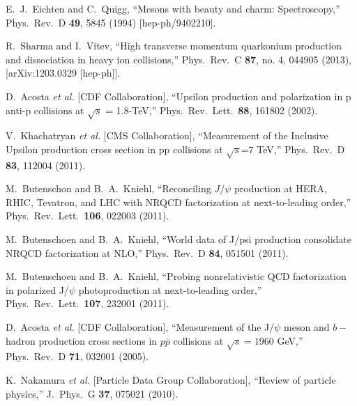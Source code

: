 \documentclass[aps,prc,preprint,superscriptaddress,showpacs,showkeys,amsmath]{revtex4-1}
\begin{document}
\begin{thebibliography}{100}
  E.~J.~Eichten and C.~Quigg,
  ``Mesons with beauty and charm: Spectroscopy,''
  Phys.\ Rev.\ D {\bf 49}, 5845 (1994)
  [hep-ph/9402210].

  R.~Sharma and I.~Vitev,
  ``High transverse momentum quarkonium production and dissociation in heavy ion collisions,''
  Phys.\ Rev.\ C {\bf 87}, no. 4, 044905 (2013),
  [arXiv:1203.0329 [hep-ph]].

  D.~Acosta {\it et al.}  [CDF Collaboration],
  ``Upsilon production and polarization in p anti-p collisions at $\sqrt{s}$ = 1.8-TeV,''
  Phys.\ Rev.\ Lett.\  {\bf 88}, 161802 (2002).

  V.~Khachatryan {\it et al.}  [CMS Collaboration],
  ``Measurement of the Inclusive Upsilon production cross section in pp collisions at $\sqrt{s}$=7 TeV,''
  Phys.\ Rev.\  D {\bf 83}, 112004 (2011).

  M.~Butenschon and B.~A.~Kniehl,
  ``Reconciling $J/\psi$ production at HERA, RHIC, Tevatron, and LHC with NRQCD factorization at next-to-leading order,''
  Phys.\ Rev.\ Lett.\  {\bf 106}, 022003 (2011).

  M.~Butenschoen and B.~A.~Kniehl,
  ``World data of J/psi production consolidate NRQCD factorization at NLO,''
  Phys.\ Rev.\  D {\bf 84}, 051501 (2011).

  M.~Butenschoen and B.~A.~Kniehl,
  ``Probing nonrelativistic QCD factorization in polarized J/$\psi$ photoproduction at next-to-leading order,''
  Phys.\ Rev.\ Lett.\  {\bf 107}, 232001 (2011).

  D.~Acosta {\it et al.}  [CDF Collaboration],
  ``Measurement of the J/$\psi$ meson and $b-$hadron production cross sections in $p\bar{p}$ collisions at $\sqrt{s} = 1960$ GeV,''
  Phys.\ Rev.\ D {\bf 71}, 032001 (2005).


  K.~Nakamura {\it et al.}  [Particle Data Group Collaboration],
  ``Review of particle physics,''
  J.\ Phys.\ G {\bf 37}, 075021 (2010).



\end{thebibliography}
\end{document}
